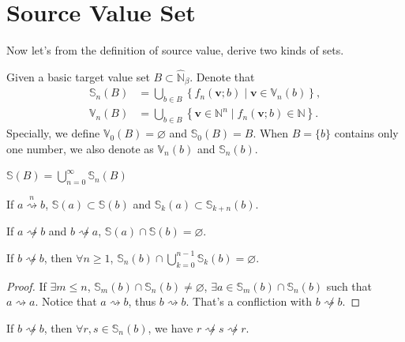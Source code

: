 \section{Source Value Set}\label{sec:source-value-set}

Now let's from the definition of source value, derive two kinds of sets.
\begin{definition}\label{def:source-value-set}
Given a basic target value set $B \subset \widehat{\mathbb{N}}_{{\beta}}$. Denote that
\begin{align*}
    \mathbb{S}_n(B) &= \bigcup_{b\in B}\left\{ f_n(\bm{v};b) \mid \bm{v} \in \mathbb{V}_n(b) \right\},\\
    \mathbb{V}_n(B) &= \bigcup_{b\in B}\left\{ \bm{v} \in \mathbb{N}^{n} \mid f_{n}(\bm{v};b) \in \mathbb{N} \right\}.
\end{align*}
Specially, we define $\mathbb{V}_0(B) = \varnothing$ and $\mathbb{S}_0(B) = B$. When $B = \{b\}$ contains only one number, we also denote as $\mathbb{V}_n(b)$ and $\mathbb{S}_n(b)$.
\end{definition}
\begin{proposition}
    $\mathbb{S}(B) = \bigcup_{n = 0}^{\infty}\mathbb{S}_{n}(B)$
\end{proposition}
\begin{proposition}\label{prop:source-set-include}
    If $a\overset{n}{\rightsquigarrow} b$, $\mathbb{S}(a) \subset \mathbb{S}(b)$ and $\mathbb{S}_{k}(a) \subset \mathbb{S}_{k+n}(b)$.
\end{proposition}
\begin{proposition}\label{prop:source-set-disjoint}
    If $a \not\rightsquigarrow b$ and $b \not\rightsquigarrow a$, $\mathbb{S}(a) \cap \mathbb{S}(b) = \varnothing$.
\end{proposition}
\begin{proposition}\label{prop:non-cycle-layer-independent}
    If $b \not\rightsquigarrow b$, then $\forall n \ge 1$, $\mathbb{S}_{n}(b) \cap \bigcup_{k = 0}^{n-1}\mathbb{S}_{k}(b) = \varnothing$.
\end{proposition}
\begin{proof}
    If $\exists m \le n$, $\mathbb{S}_{m}(b) \cap \mathbb{S}_{n}(b) \ne \varnothing$, $\exists a \in \mathbb{S}_{m}(b) \cap \mathbb{S}_{n}(b)$ such that $a \rightsquigarrow a$. Notice that $a \rightsquigarrow b$, thus $b\rightsquigarrow b$. That's a confliction with $b \not\rightsquigarrow b$.
\end{proof}
\begin{proposition}
    If $b \not\rightsquigarrow b$, then $\forall r, s\in\mathbb{S}_{n}(b)$, we have $r \not\rightsquigarrow s \not\rightsquigarrow r$.
\end{proposition}
